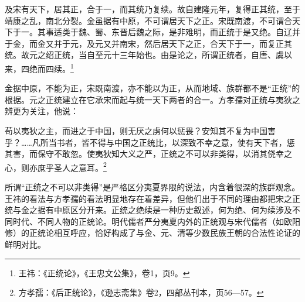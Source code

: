 \documentclass[a4paper, 12pt, openright]{ctexbook}
\renewenvironment{quote}
  {\list{}{\rightmargin2\ccwd \leftmargin2\ccwd \itemindent=2\ccwd \listparindent=2\ccwd}%
   \item\relax\small\kaishu\color{black}}
  {\endlist}
\begin{document}
\begin{quote}
及宋有天下，居其正，合于一，而其统乃复续。故自建隆元年，复得正其统，至于靖康之乱，南北分裂。金虽据有中原，不可谓居天下之正。宋既南渡，不可谓合天下于一。其事适类于魏、蜀、东晋后魏之际，是非难明，而正统于是又绝。自辽并于金，而金又并于元，及元又并南宋，然后居天下之正，合天下于一，而复正其统。故元之绍正统，当自至元十三年始也。由是论之，所谓正统者，自唐、虞以来，四绝而四续。\footnote{王祎：《正统论》，《王忠文公集》，卷1，页9。}
\end{quote}

金据中原，不能为正，宋既南渡，亦不能以为正，从而地域、族群都不是“正统”的根据。元之正统建立在它承宋而起与统一天下两者的合一。方孝孺对正统与夷狄之辨更为关注，他说：

\begin{quote}
苟以夷狄之主，而进之于中国，则无厌之虏何以惩畏？安知其不复为中国害乎？……凡所当书者，皆不得与中国之正统比，以深致不幸之意，使有天下者，惩其害，而保守不敢忽。使夷狄知大义之严，正统之不可以非类得，以消其侥幸之心，则亦庶乎圣人之意耳。\footnote{方孝孺：《后正统论》，《逊志斋集》卷2，四部丛刊本，页56—57。}
\end{quote}

所谓“正统之不可以非类得”是严格区分夷夏界限的说法，内含着很深的族群观念。王祎的看法与方孝孺的看法明显地存在着差异，但他们出于不同的理由都把宋之正统与金之据有中原区分开来。正统之绝续是一种历史叙述，何为绝、何为续涉及不同时代、不同人物的正统论。明代儒者严分夷夏内外的正统观与宋代儒者（如欧阳修）的正统论相互呼应，恰好构成了与金、元、清等少数民族王朝的合法性论证的鲜明对比。
\end{document}
